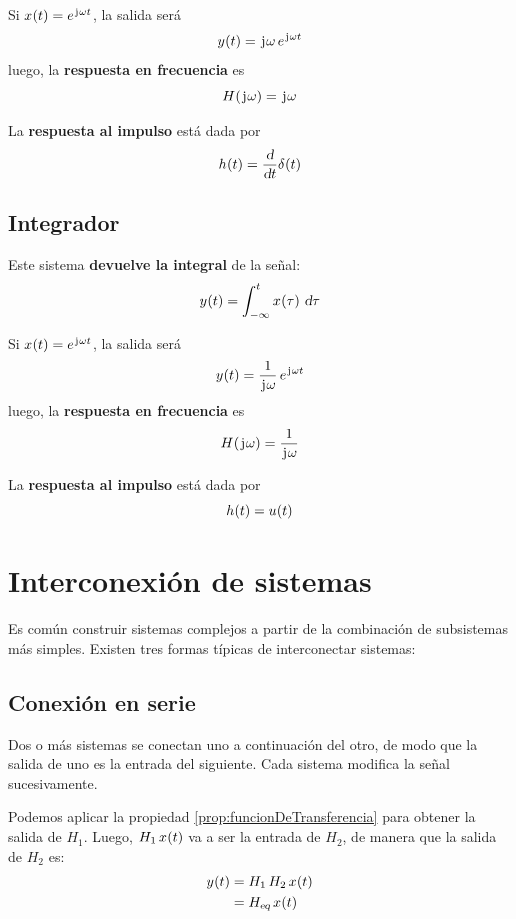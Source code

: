 Si $\fx[x]{t} = \complexExp$, la salida será
\[
    \fx[y]{t} = \iu \omega \, \complexExp
\]
luego, la \textbf{respuesta en frecuencia} es
\[
    \fx[H]{\iu \omega} = \iu \omega
\]

La \textbf{respuesta al impulso} está dada por
\[
    \fx[h]{t} = \frac{\dif}{\dif t} \fx[\delta]{t}
\]

\subsection{Integrador}

Este sistema \textbf{devuelve la integral} de la señal:
\[
    \fx[y]{t} = \int_{-\infty}^{t} \fx[x]{\tau} \, \dif \tau
\]

Si $\fx[x]{t} = \complexExp$, la salida será
\[
    \fx[y]{t} = \frac{1}{\iu \omega} \, \complexExp
\]
luego, la \textbf{respuesta en frecuencia} es
\[
    \fx[H]{\iu \omega} = \frac{1}{\iu \omega}
\]

La \textbf{respuesta al impulso} está dada por
\[
    \fx[h]{t} = \fx[u]{t}
\]

\section{Interconexión de sistemas}

Es común construir sistemas complejos a partir de la combinación de subsistemas más simples.
Existen tres formas típicas de interconectar sistemas:

\subsection{Conexión en serie}

Dos o más sistemas se conectan uno a continuación del otro, de modo que la salida de uno es la entrada del siguiente.
Cada sistema modifica la señal sucesivamente.

\begin{center}
    \def\svgwidth{0.8\linewidth}
    
\end{center}

Podemos aplicar la propiedad \ref{prop:funcionDeTransferencia} para obtener la salida de $H_1$.
Luego, $H_1 \, \fx[x]{t}$ va a ser la entrada de $H_2$, de manera que la salida de $H_2$ es:
\begin{align*}
    \fx[y]{t}
    & = H_1 \, H_2 \, \fx[x]{t}
    \\
    & = \sub{H}{eq} \, \fx[x]{t}
\end{align*}


